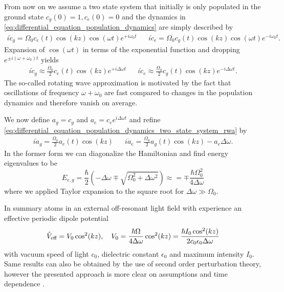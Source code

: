 From now on we assume a two state system that initially is only populated in
the ground state $c_g(0)=1,c_e(0)=0$ and the dynamics in
\cref{eq:differential_equation_population_dynamics} are simply described by
\begin{align}
  i\dot{c}_g=\Omega_0c_e(t)\cos(kz)\cos(\omega t)e^{+i\omega_0 t} &&
  i\dot{c}_e=\Omega_0c_g(t)\cos(kz)\cos(\omega t)e^{-i\omega_0 t}
  \label{eq:differential_equation_population_dynamics_two_state_system}.
\end{align}
Expansion of $\cos(\omega t)$ in terms of the exponential function and
dropping $e^{\pm i(\omega+\omega_0)t}$ yields
\begin{align}
  i\dot{c}_g\approx\frac{\Omega_0}{2}c_e(t)\cos(kz)e^{+i\Delta\omega t} &&
  i\dot{c}_e\approx\frac{\Omega_0}{2}c_g(t)\cos(kz)e^{-i\Delta\omega t}
  \label{eq:differential_equation_population_dynamics_two_state_system_rwa}.
\end{align}
The so-called rotating wave approximation is motivated by the fact that
oscillations of frequency $\omega+\omega_0$ are fast compared to changes in
the population dynamics and therefore vanish on average.

We now define $a_g=c_g$ and $a_e=c_ee^{i\Delta\omega t}$ and refine
\cref{eq:differential_equation_population_dynamics_two_state_system_rwa} by
\begin{align}
  i\dot{a}_g=\frac{\Omega_0}{2}a_e(t)\cos(kz) &&
  i\dot{a}_e=\frac{\Omega_0}{2}a_g(t)\cos(kz)-a_e\Delta\omega
  \label{eq:differential_equation_population_dynamics_two_state_system_shift}.
\end{align}
In the former form we can diagonalize the Hamiltonian and find energy
eigenvalues to be
\begin{equation}
  E_{e,g}
  =\frac{\hbar}{2}\left(-\Delta\omega\mp\sqrt{\Omega_0^2+\Delta\omega^2}\right)
  \approx
  =\mp\frac{\hbar\Omega_0^2}{4\Delta\omega}
  \label{eq:eigenvalues_energy_light_shift}
\end{equation}
where we applied Taylor expansion to the square root for
$\Delta\omega\gg\Omega_0$.

In summary atoms in an external off-resonant light field with experience an
effective periodic dipole potential
\begin{equation}
  \hat{V}_\text{eff}
  =V_0\cos^2(kz)
  \qc
  V_0
  =\frac{\hbar\Omega}{4\Delta\omega}\cos^2(kz)
  =\frac{\hbar I_0\cos^2(kz)}{2c_0\epsilon_0\Delta\omega}
  \label{eq:potential_effective}
\end{equation}
with vacuum speed of light $c_0$, dielectric constant $\epsilon_0$ and
maximum intensity $I_0$. Same results can also be obtained by the use of
second order perturbation theory, however the presented approach is more
clear on assumptions and time dependence \cite{Grimm2008}.

